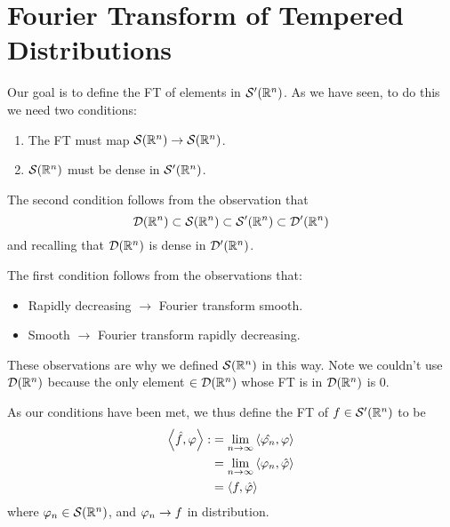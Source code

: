 \section{Fourier Transform of Tempered Distributions}
Our goal is to define the FT of elements in ${\mathcal S}'({\mathbb R}^n)$. As we have seen, to do this we need two conditions:
\begin{enumerate}
    \item The FT must map ${\mathcal S}({\mathbb R}^n) \to {\mathcal S}({\mathbb R}^n)$.
    \item ${\mathcal S}({\mathbb R}^n)$ must be dense in ${\mathcal S}'({\mathbb R}^n)$.
\end{enumerate}
The second condition follows from the observation that
\[
    {\mathcal D}({\mathbb R}^n) \subset {\mathcal S}({\mathbb R}^n) \subset {\mathcal S}'({\mathbb R}^n) \subset {\mathcal D}'({\mathbb R}^n)
\]
and recalling that ${\mathcal D}({\mathbb R}^n)$ is dense in ${\mathcal D}'({\mathbb R}^n)$.

The first condition follows from the observations that:
\begin{itemize}
    \item Rapidly decreasing $\to$ Fourier transform smooth.
    \item Smooth $\to$ Fourier transform rapidly decreasing.
\end{itemize}
These observations are why we defined ${\mathcal S}({\mathbb R}^n)$ in this way. Note we couldn't use ${\mathcal D}({\mathbb R}^n)$ because the only element $\in {\mathcal D}({\mathbb R}^n)$ whose FT is in ${\mathcal D}({\mathbb R}^n)$ is 0.

As our conditions have been met, we thus define the FT of $f \in {\mathcal S}'({\mathbb R}^n)$ to be
\[
    \begin{split}
        \left\langle \hat{f}, \varphi \right\rangle : & = \lim_{n \to \infty} \left\langle \hat{\varphi_n}, \varphi \right\rangle \\
                                                   & = \lim_{n \to \infty} \left\langle \varphi_n, \hat{\varphi} \right\rangle \\
                                                   & = \left\langle f, \hat{\varphi} \right\rangle
    \end{split}
\]
where $\varphi_n \in {\mathcal S}({\mathbb R}^n)$, and $\varphi_n \to f$ in distribution.

